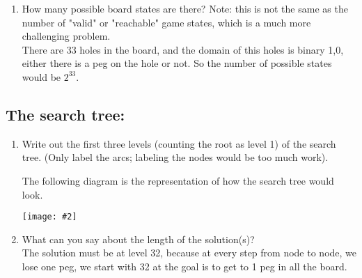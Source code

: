 \documentclass{article}
\def\ans#1{{\color{ans}#1}}
\newcommand{\centerfig}[2]{\begin{center}\texttt{[image: \#2]}\end{center}}
\begin{document}
\begin{enumerate}[label=(\alph*)]
{        the peg that is moving to the column $i'$ and row $j'$, e.g., an arc with the label 
        31.33 will represent that a peg in row 3 column 1 will be moved to row 3 column 3.
    }
    \item How many possible board states are there? Note: this is not the same as the number of "valid" or "reachable" game states, which is a much more challenging problem.\\
    \ans{
        There are 33 holes in the board, and the domain of this holes is binary {1,0}, 
        either there is a peg on the hole or not. So the number of possible states would 
        be $2^{33}$.
    }
\end{enumerate}

\subsection{The search tree:}
\begin{enumerate}[label=(\alph*)]
    \item Write out the first three levels (counting the root as level 1) of the search tree. (Only label the arcs; labeling the nodes would be too much work). \\
    \ans{
        The following diagram is the representation of how the search tree would look.
        \centerfig{0.8}{../figs/q2_2_a}
    }
    \item What can you say about the length of the solution(s)? \\
    \ans{
        The solution must be at level 32, because at every step from node to node, we 
        lose one peg, we start with 32 at the goal is to get to 1 peg in all the board.
    }

\end{enumerate}
\end{document}
